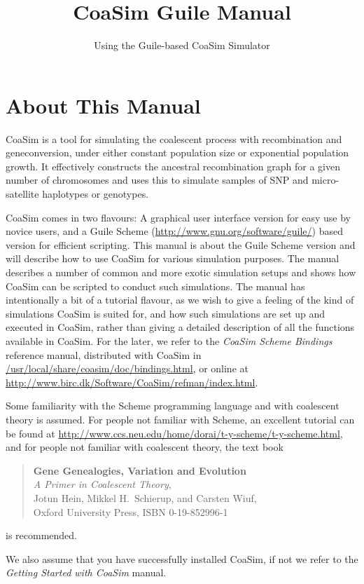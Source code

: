 \documentclass{manual}
\title{CoaSim Guile Manual}
\subtitle{Using the Guile-based CoaSim Simulator}
\begin{document}
\section{About This Manual}
\label{sec:about-this-manual}

CoaSim is a tool for simulating the coalescent process with
recombination and geneconversion, under either constant population
size or exponential population growth.  It effectively constructs the
ancestral recombination graph for a given number of chromosomes and
uses this to simulate samples of SNP and micro-satellite haplotypes or
genotypes.

CoaSim comes in two flavours: A graphical user interface version for
easy use by novice users, and a Guile Scheme
(\url{http://www.gnu.org/software/guile/}) based version for efficient
scripting.  This manual is about the Guile Scheme version and will
describe how to use CoaSim for various simulation purposes.  The
manual describes a number of common and more exotic simulation setups
and shows how CoaSim can be scripted to conduct such simulations.  The
manual has intentionally a bit of a tutorial flavour, as we wish to
give a feeling of the kind of simulations CoaSim is suited for, and
how such simulations are set up and executed in CoaSim, rather than
giving a detailed description of all the functions available in
CoaSim.  For the later, we refer to the \emph{CoaSim Scheme Bindings}
reference manual, distributed with CoaSim in
\url{/usr/local/share/coasim/doc/bindings.html}, or online at
\url{http://www.birc.dk/Software/CoaSim/refman/index.html}.

Some familiarity with the Scheme programming language and with
coalescent theory is assumed.  For people not familiar with Scheme, an
excellent tutorial can be found at
\url{http://www.ccs.neu.edu/home/dorai/t-y-scheme/t-y-scheme.html},
and for people not familiar with coalescent theory, the text book
\begin{quote}
  \textbf{Gene Genealogies, Variation and Evolution}\\
  \textit{A Primer in Coalescent Theory},\\
  Jotun Hein, Mikkel H.\ Schierup, and Carsten Wiuf,\\
  Oxford University Press, ISBN 0-19-852996-1  
\end{quote}
is recommended.

We also assume that you have successfully installed CoaSim, if not we
refer to the \emph{Getting Started with CoaSim} manual.
\end{document}
